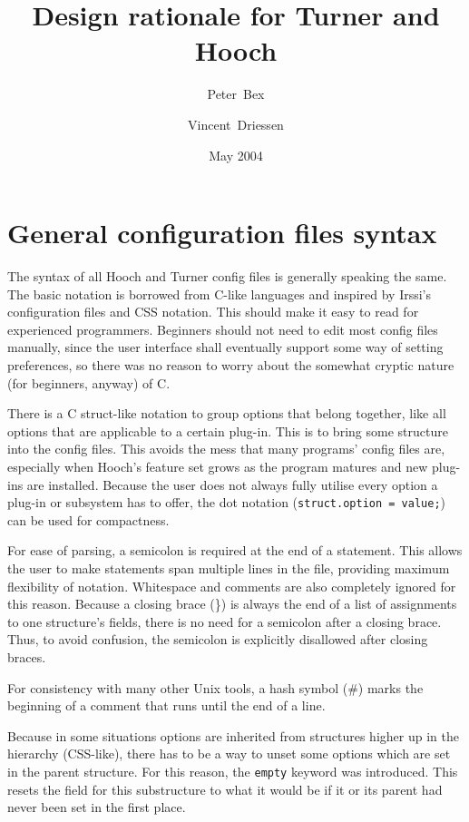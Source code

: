 \documentclass[a4paper]{article}
\title{Design rationale for Turner and Hooch}
\date{May 2004}
\author{Peter~Bex\and{}Vincent~Driessen}
\begin{document}
\maketitle

\section{General configuration files syntax}

The syntax of all Hooch and Turner config files is generally speaking the same.
The basic notation is borrowed from C-like languages and inspired by
Irssi's configuration files and CSS notation.  This should make it easy
to read for experienced programmers.  Beginners should not need to edit
most config files manually, since the user interface shall eventually
support some way of setting preferences, so there was no reason to worry
about the somewhat cryptic nature (for beginners, anyway) of C.

There is a C struct-like notation to group options that belong together,
like all options that are applicable to a certain plug-in.  This is to
bring some structure into the config files.  This avoids the mess that
many programs' config files are, especially when Hooch's feature set grows
as the program matures and new plug-ins are installed.
Because the user does not always fully utilise every option a plug-in or
subsystem has to offer, the dot notation (\texttt{struct.option = value;})
can be used for compactness.

For ease of parsing, a semicolon is required at the end of a statement.
This allows the user to make statements span multiple lines in the file,
providing maximum flexibility of notation.  Whitespace and comments are
also completely ignored for this reason.  Because a closing brace (\}) is
always the end of a list of assignments to one structure's fields, there
is no need for a semicolon after a closing brace.  Thus, to avoid confusion,
the semicolon is explicitly disallowed after closing braces.

For consistency with many other Unix tools, a hash symbol (\#) marks the
beginning of a comment that runs until the end of a line.

Because in some situations options are inherited from structures higher
up in the hierarchy (CSS-like), there has to be a way to unset some
options which are set in the parent structure.  For this reason, the
\texttt{empty} keyword was introduced.  This resets the field for this
substructure to what it would be if it or its parent had never been set
in the first place.
\end{document}
